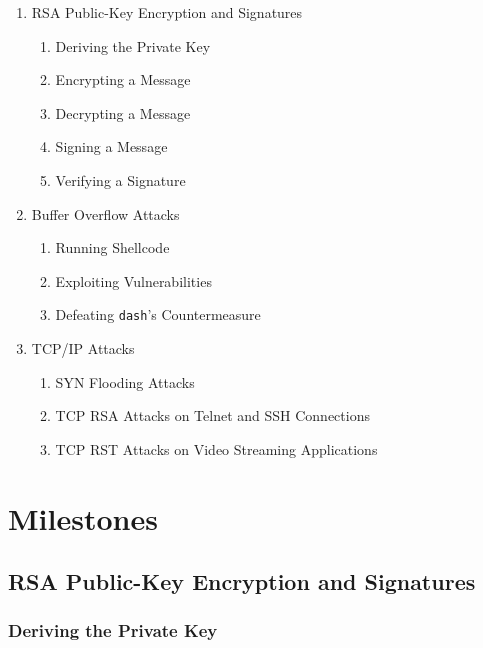 \documentclass[12pt]{article}
\begin{document}
\begin{enumerate}
    \item RSA Public-Key Encryption and Signatures
          \begin{enumerate}
              \item Deriving the Private Key
              \item Encrypting a Message
              \item Decrypting a Message
              \item Signing a Message
              \item Verifying a Signature
          \end{enumerate}
    \item Buffer Overflow Attacks
          \begin{enumerate}
              \item Running Shellcode
              \item Exploiting Vulnerabilities
              \item Defeating \texttt{dash}’s Countermeasure
          \end{enumerate}
    \item TCP/IP Attacks
          \begin{enumerate}
              \item SYN Flooding Attacks
              \item TCP RSA Attacks on Telnet and SSH Connections
              \item TCP RST Attacks on Video Streaming Applications
          \end{enumerate}
\end{enumerate}



\newpage

\section{Milestones}

\subsection{RSA Public-Key Encryption and Signatures}

\subsubsection{Deriving the Private Key}
\end{document}
